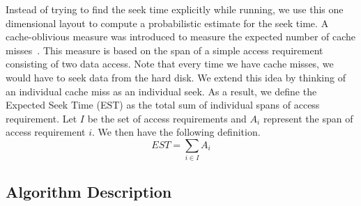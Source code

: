 Instead of trying to find the seek time explicitly while
running, we use this
one dimensional layout to compute a probabilistic estimate for the seek time. A
cache-oblivious measure was introduced to measure the expected number of cache
misses~\cite{cacheobliviouslayout}. This measure is
based on the span of a simple access requirement consisting of two data access.
Note that every time we have cache misses, we would have to seek data from the
hard disk. We extend this idea by thinking of an individual cache miss as an
individual seek.
As a result, we define the Expected Seek Time (EST) as the total sum of
individual spans of access requirement.
Let $I$ be the set of access requirements and $A_i$
represent the span of access requirement $i$. 
We then have the following definition. 
\[
EST = \sum_{i \in I} A_i
\]


\subsection{Algorithm Description}

